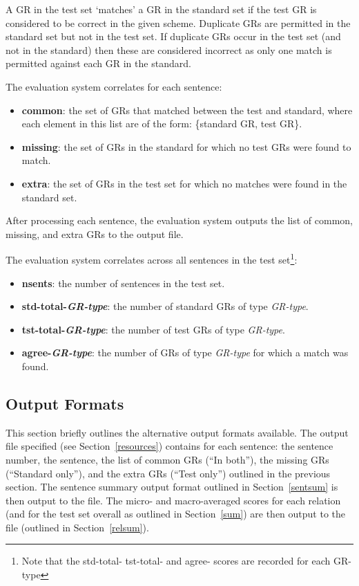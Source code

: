 \documentclass[10pt]{article}
\begin{document}
A GR in the test set `matches' a GR in the standard set if the test
GR is considered to be correct in the given scheme.
Duplicate GRs are permitted in the standard set but not in the test set. 
If duplicate GRs occur in the test set (and not in the standard)
then these are considered incorrect as only one match 
is permitted against each GR in the standard.

The evaluation system correlates for each sentence:
\begin{itemize}
\item {\bf common}: the set of GRs that matched between the test and
  standard, where each element in this list are of the form: 
\{standard GR, test GR\}.
\item {\bf missing}: the set of GRs in the standard for which no test
GRs were found to match.
\item {\bf extra}: the set of GRs in the test set for which no
  matches were found in the standard set.
\end{itemize}
After processing each sentence, the evaluation system outputs
the list of common, missing, and extra GRs to the output file.

The evaluation system correlates across all sentences in the test
set\footnote{Note that the std-total- tst-total- and agree- scores
are recorded for each GR-type}:
\begin{itemize}
\item {\bf nsents}: the number of sentences in the test set.
\item {\bf std-total-\emph{GR-type}}: 
the number of standard GRs of type \emph{GR-type}.
\item {\bf tst-total-\emph{GR-type}}: 
the number of test GRs of type \emph{GR-type}.
\item {\bf agree-\emph{GR-type}}: 
the number of GRs of type \emph{GR-type} for which a match was found.
\end{itemize}

\subsection{Output Formats}

This section briefly outlines the alternative output formats
available. The output file specified (see Section~\ref{resources})
contains for each sentence: the sentence number, the sentence, 
the list of common GRs (``In both''), the missing GRs (``Standard
only''), and the extra GRs (``Test only'') outlined in the previous
section. 
The sentence summary output format outlined in Section~\ref{sentsum} 
is then output to the file. 
The micro- and macro-averaged scores for each relation (and
for the test set overall as outlined in Section~\ref{sum}) 
are then output to the file (outlined in Section~\ref{relsum}).
\end{document}
